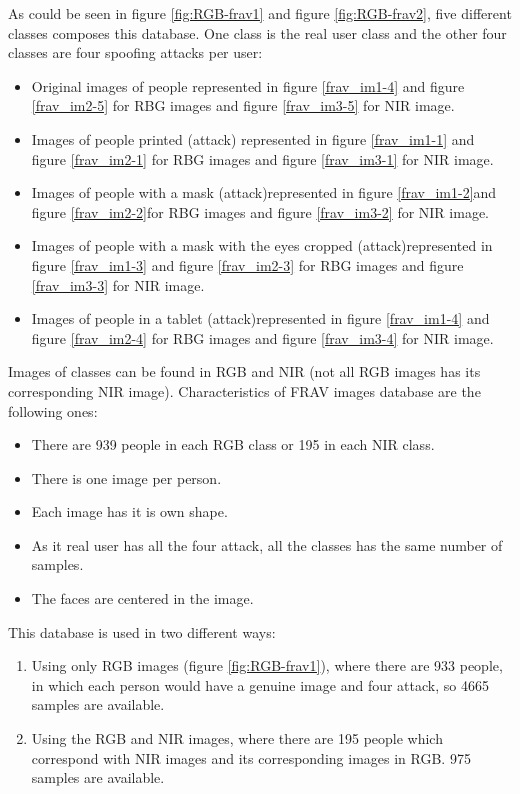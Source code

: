 As could be seen in figure \ref{fig:RGB-frav1} and figure \ref{fig:RGB-frav2}, five different classes composes this database. One class is the real user class and the other four classes are four spoofing attacks per user:\\

\begin{itemize}
 \item Original images of people represented in figure \ref{frav_im1-4} and figure \ref{frav_im2-5} for RBG images and figure \ref{frav_im3-5} for NIR image.
 \item Images of people printed (attack) represented in figure \ref{frav_im1-1} and figure \ref{frav_im2-1} for RBG images and figure \ref{frav_im3-1} for NIR image.
 \item Images of people with a mask (attack)represented in figure \ref{frav_im1-2}and figure \ref{frav_im2-2}for RBG images and figure \ref{frav_im3-2} for NIR image.
 \item Images of people with a mask with the eyes cropped (attack)represented in figure \ref{frav_im1-3} and figure \ref{frav_im2-3} for RBG images and figure \ref{frav_im3-3} for NIR image.
 \item Images of people in a tablet (attack)represented in figure \ref{frav_im1-4} and figure \ref{frav_im2-4} for RBG images and figure \ref{frav_im3-4} for NIR image.\\
 \end{itemize}

Images of classes can be found in RGB and NIR (not all RGB images has its corresponding NIR image). Characteristics of FRAV images database are the following ones:\\

\begin{itemize}
\item There are 939 people in each RGB class or 195 in each NIR class.
\item There is one image per person.
\item Each image has it is own shape.
\item As it real user has all the four attack, all the classes has the same number of samples.
\item The faces are centered in the image.\\
\end{itemize}

This database is used in two different ways:

\begin{enumerate}
  \item Using only RGB images (figure \ref{fig:RGB-frav1}), where there are 933 people, in which each person would have a genuine image and four attack, so 4665 samples are available.
  \item Using the RGB and NIR images, where there are 195 people which correspond with NIR images and its corresponding images in RGB. 975 samples are available.
\end{enumerate}

